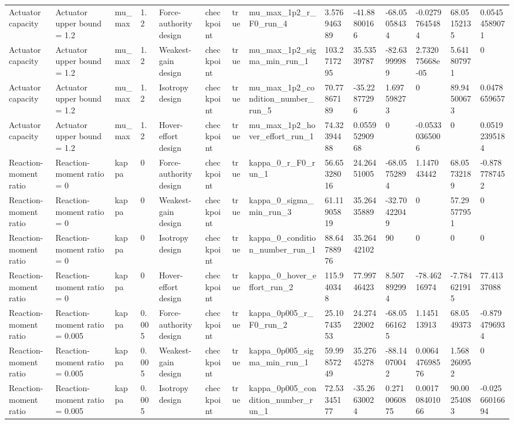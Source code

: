 \begin{tabular}{@{}llllllllllllll@{}}
Actuator capacity & Actuator upper bound = 1.2 & mu\_max & 1.2 & Force-authority design & checkpoint & true & mu\_max\_1p2\_r\_F0\_run\_4 & 3.576946389 & -41.88800166 & -68.05058434 & -0.02797645484 & 68.05152135 & 0.05454589071 \\
Actuator capacity & Actuator upper bound = 1.2 & mu\_max & 1.2 & Weakest-gain design & checkpoint & true & mu\_max\_1p2\_sigma\_min\_run\_1 & 103.2717295 & 35.53539787 & -82.63999989 & 2.732075668e-05 & 5.641807971 & 0 \\
Actuator capacity & Actuator upper bound = 1.2 & mu\_max & 1.2 & Isotropy design & checkpoint & true & mu\_max\_1p2\_condition\_number\_run\_5 & 70.77867189 & -35.22877296 & 1.697598273 & 0 & 89.94500673 & 0.0478659657 \\
Actuator capacity & Actuator upper bound = 1.2 & mu\_max & 1.2 & Hover-effort design & checkpoint & true & mu\_max\_1p2\_hover\_effort\_run\_1 & 74.32394488 & 0.05595290968 & 0 & -0.05330365006 & 0 & 0.05192395184 \\
Reaction-moment ratio & Reaction-moment ratio = 0 & kappa & 0 & Force-authority design & checkpoint & true & kappa\_0\_r\_F0\_run\_1 & 56.65328016 & 24.26451005 & -68.05752894 & 1.147043442 & 68.05732189 & -0.8787787452 \\
Reaction-moment ratio & Reaction-moment ratio = 0 & kappa & 0 & Weakest-gain design & checkpoint & true & kappa\_0\_sigma\_min\_run\_3 & 61.11905819 & 35.26435889 & -32.70422049 & 0 & 57.29577951 & 0 \\
Reaction-moment ratio & Reaction-moment ratio = 0 & kappa & 0 & Isotropy design & checkpoint & true & kappa\_0\_condition\_number\_run\_1 & 88.64788976 & 35.26442102 & 90 & 0 & 0 & 0 \\
Reaction-moment ratio & Reaction-moment ratio = 0 & kappa & 0 & Hover-effort design & checkpoint & true & kappa\_0\_hover\_effort\_run\_2 & 115.940348 & 77.99746423 & 8.507892994 & -78.46216974 & -7.784621915 & 77.41337088 \\
Reaction-moment ratio & Reaction-moment ratio = 0.005 & kappa & 0.005 & Force-authority design & checkpoint & true & kappa\_0p005\_r\_F0\_run\_2 & 25.10743553 & 24.27422002 & -68.05661625 & 1.145113913 & 68.0549373 & -0.8794796934 \\
Reaction-moment ratio & Reaction-moment ratio = 0.005 & kappa & 0.005 & Weakest-gain design & checkpoint & true & kappa\_0p005\_sigma\_min\_run\_1 & 59.99857249 & 35.27645278 & -88.14070042 & 0.006447698576 & 1.568260952 & 0 \\
Reaction-moment ratio & Reaction-moment ratio = 0.005 & kappa & 0.005 & Isotropy design & checkpoint & true & kappa\_0p005\_condition\_number\_run\_1 & 72.53345177 & -35.26630024 & 0.2710060875 & 0.001708401066 & 90.00254083 & -0.02566016694 \\

\end{tabular}
